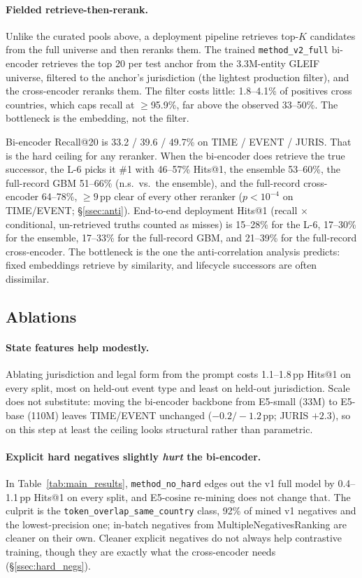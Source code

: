 \documentclass[sigconf]{acmart}
\begin{document}
\paragraph{Fielded retrieve-then-rerank.} Unlike the curated pools
above, a deployment pipeline retrieves top-$K$ candidates from the
full universe and then reranks them. The trained
\texttt{method\_v2\_full} bi-encoder retrieves the top 20 per test
anchor from the 3.3M-entity GLEIF universe, filtered to the
anchor's jurisdiction (the lightest production filter), and the
cross-encoder reranks them. The filter costs little: 1.8--4.1\% of
positives cross countries, which caps recall at $\geq$95.9\%, far
above the observed 33--50\%. The bottleneck is the embedding, not
the filter.

Bi-encoder Recall@20 is 33.2 / 39.6 / 49.7\% on TIME / EVENT /
JURIS. That is the hard ceiling for any reranker. When the bi-encoder
does retrieve the true successor, the L-6 picks it \#1 with
46--57\% Hits@1, the ensemble 53--60\%, the full-record GBM
51--66\% (n.s.\ vs.\ the ensemble), and the full-record
cross-encoder 64--78\%, $\geq9$\,pp clear of every other reranker
($p<10^{-4}$ on TIME/EVENT; \S\ref{ssec:anti}).
End-to-end deployment Hits@1 (recall $\times$ conditional,
un-retrieved truths counted as misses) is 15--28\% for the L-6,
17--30\% for the ensemble, 17--33\% for the full-record GBM, and
21--39\% for the full-record cross-encoder. The bottleneck is the
one the anti-correlation analysis predicts: fixed embeddings
retrieve by similarity, and lifecycle successors are often
dissimilar.

\subsection{Ablations}
\label{ssec:ablations}

\paragraph{State features help modestly.} Ablating jurisdiction and
legal form from the prompt costs 1.1--1.8\,pp Hits@1 on every split,
most on held-out event type and least on held-out jurisdiction.
Scale does not substitute: moving the bi-encoder backbone from
E5-small (33M) to E5-base (110M) leaves TIME/EVENT unchanged
($-0.2 / {-}1.2$\,pp; JURIS $+2.3$), so on this step at least the
ceiling looks structural rather than parametric.

\paragraph{Explicit hard negatives slightly \emph{hurt} the
bi-encoder.} In Table~\ref{tab:main_results},
\texttt{method\_no\_hard} edges out the v1 full model by
0.4--1.1\,pp Hits@1 on every split, and E5-cosine re-mining does not
change that. The culprit is the
\texttt{token\_overlap\_same\_country} class, 92\% of mined v1
negatives and the lowest-precision one; in-batch negatives from
MultipleNegativesRanking are cleaner on their own. Cleaner explicit
negatives do not always help contrastive training, though they are
exactly what the cross-encoder needs (\S\ref{ssec:hard_negs}).
\end{document}
